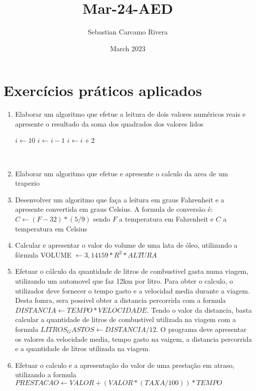 \documentclass{article}
\title{Mar-24-AED}
\author{Sebastian Carcamo Rivera}
\date{March 2023}
\begin{document}
\maketitle

\section{Exercícios práticos aplicados}
\begin{enumerate}
    \item Elaborar um algoritmo que efetue a leitura de dois valores numéricos reais e apresente o resultado da soma dos quadrados dos valores lidos
    \begin{algorithm}
    \STATE $i\gets 10$
  \STATE $i\gets i-1$
\ELSE
    \STATE $i\gets i+2$
  \ENDIF
\ENDIF 
    \end{algorithm}
    \\
    \item Elaborar um algoritmo que efetue e apresente o calculo da area de um trapezio
    \\
    \item Desenvolver um algoritmo que faça a leitura em graus Fahrenheit e a apresente convertida em graus Celsius. A formula de conversão é: $C\leftarrow (F-32)*(5/9)$ sendo $F$ a temperatura em Fahrenheit e $C$ a temperatura em Celsius
    \\
    \item Calcular e apresentar o valor do volume de uma lata de óleo, utilizando a fórmula VOLUME $\leftarrow 3,14159 * R^2*ALTURA$
    \\
    \item Efetuar o cálculo da quantidade de litros de combustivel gasta numa viagem, utilizando um automovel que faz 12km por litro. Para obter o calculo, o utilizador deve fornecer o tempo gasto e a velocidad media durante a viagem. Desta fomra, sera possivel obter a distancia percorrida com a formula $DISTANCIA \leftarrow TEMPO * VELOCIDADE$. Tendo o valor da distancia, basta calcular a quantidade de litros de combustivel utilizada na viagem com a formula $LITROS_GASTOS \leftarrow DISTANCIA /12$. O programa deve apresentar os valores da velocidade media, tempo gasto na vaigem, a distancia percorrida e a quantidade de litros utilizada na viagem.
    \\
    \item Efetuar o calculo e a apresentação do valor de uma prestação em atraso, utilizando a formula $PRESTACAO \leftarrow VALOR + (VALOR*(TAXA/100))*TEMPO$

\end{enumerate}
\end{document}
